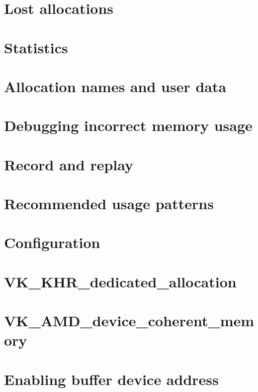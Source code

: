 \let\mypdfximage\pdfximage\def\pdfximage{\immediate\mypdfximage}\documentclass[twoside]{book}
\newcommand{\+}{\discretionary{\mbox{\scriptsize$\hookleftarrow$}}{}{}}
\begin{document}
\chapter{Lost allocations}
\label{lost_allocations}

\chapter{Statistics}
\label{statistics}

\chapter{Allocation names and user data}
\label{allocation_annotation}

\chapter{Debugging incorrect memory usage}
\label{debugging_memory_usage}

\chapter{Record and replay}
\label{record_and_replay}

\chapter{Recommended usage patterns}
\label{usage_patterns}

\chapter{Configuration}
\label{configuration}

\chapter{VK\+\_\+\+KHR\+\_\+dedicated\+\_\+allocation}
\label{vk_khr_dedicated_allocation}

\chapter{VK\+\_\+\+AMD\+\_\+device\+\_\+coherent\+\_\+memory}
\label{vk_amd_device_coherent_memory}

\chapter{Enabling buffer device address}
\label{enabling_buffer_device_address}

\end{document}
